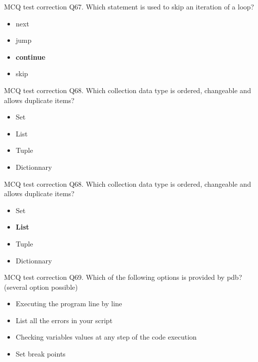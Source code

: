 \documentclass[
  8pt,
  ignorenonframetext,
]{beamer}
\providecommand{\tightlist}{%
  \setlength{\itemsep}{0pt}\setlength{\parskip}{0pt}}
\begin{document}
\begin{frame}{MCQ test correction}
\protect\hypertarget{mcq-test-correction-133}{}
Q67. Which statement is used to skip an iteration of a loop?

\begin{itemize}
\tightlist
\item
  next
\item
  jump
\item
  \textbf{continue}
\item
  skip
\end{itemize}
\end{frame}

\begin{frame}{MCQ test correction}
\protect\hypertarget{mcq-test-correction-134}{}
Q68. Which collection data type is ordered, changeable and allows
duplicate items?

\begin{itemize}
\tightlist
\item
  Set
\item
  List
\item
  Tuple
\item
  Dictionnary
\end{itemize}
\end{frame}

\begin{frame}{MCQ test correction}
\protect\hypertarget{mcq-test-correction-135}{}
Q68. Which collection data type is ordered, changeable and allows
duplicate items?

\begin{itemize}
\tightlist
\item
  Set
\item
  \textbf{List}
\item
  Tuple
\item
  Dictionnary
\end{itemize}
\end{frame}

\begin{frame}{MCQ test correction}
\protect\hypertarget{mcq-test-correction-136}{}
Q69. Which of the following options is provided by pdb? (several option
possible)

\begin{itemize}
\tightlist
\item
  Executing the program line by line
\item
  List all the errors in your script
\item
  Checking variables values at any step of the code execution
\item
  Set break points
\end{itemize}
\end{frame}
\end{document}
